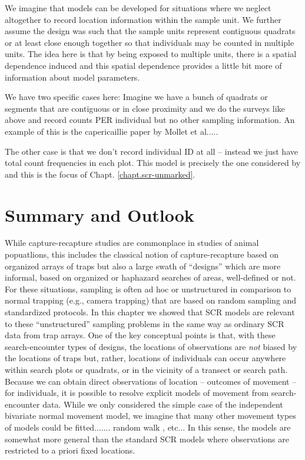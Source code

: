 We imagine that models can be developed for
situations where we neglect
altogether to record location information within the sample unit. We
further assume the design was such that the sample units represent
contiguous quadrats or at least close enough together so that
individuals may be counted in multiple units. The idea here is that by
being exposed to multiple units, there is a spatial dependence induced
and this spatial dependence provides a little bit more of information
about model parameters.

We have two specific cases here:
Imagine we have a bunch of quadrats or segments that are contiguous or
in close proximity
and we do the surveys like above and record counts PER individual  but
no other sampling information. An example of this is the capericaillie
paper by Mollet et al.....

The other case is that we don't record individual ID at all -- instead
we just have total count frequencies in each plot.
This model is precisely the one considered by
\citep{chandler_royle:2012} and this is the focus of Chapt. \ref{chapt.scr-unmarked}.





\section{Summary and Outlook}

While capture-recapture studies are commonplace in studies of animal
popuatlions,
this includes
the classical notion of capture-recapture based on organized arrays of
traps  but also a large swath of ``designs'' which are more informal,
based on organized or haphazard searches of areas, well-defined or
not. For these situations, sampling is often ad hoc or unstructured in
comparison to normal trapping (e.g., camera trapping) that are based on random
sampling and standardized protocols.
 In this chapter we showed that SCR models are relevant to these
``unstructured'' sampling problems in the same way as ordinary SCR
data from trap arrays. One of the key conceptual points is that, with
these search-encounter types of designs, the locations of observations
are {\it not} biased by the locations of traps but, rather, locations
of individuals can occur anywhere within search plots or quadrats, or
in the vicinity of a transect or search path.
Because we can obtain direct observations of location -- outcomes of
movement -- for individuals, it is possible to resolve explicit models
of movement from search-encounter data.
While we only considered the simple case of the independent bivariate
normal movement model, we imagine that many other movement types of
models could be fitted....... random walk , etc...
In this sense, the models are somewhat more general than the standard
SCR models where observations are restricted to a priori fixed
locations.


